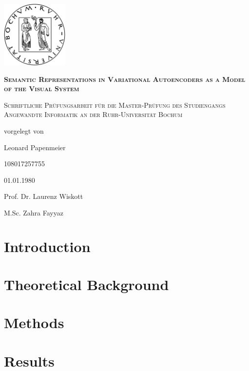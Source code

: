 \documentclass[11pt]{article}
\newcounter{savepage}
\begin{document}
    \begin{titlepage}
        \centering
        \includegraphics[width=0.25\textwidth]{rublogo.png}\par
        {\scshape\huge\bfseries Semantic Representations in Variational Autoencoders as a Model of the Visual System \par}
        {\scshape\large Schriftliche Prüfungsarbeit für die Master-Prüfung des Studiengangs Angewandte Informatik an der Ruhr-Universität Bochum\par}
        \vspace{1em}
        vorgelegt von\par
        \vspace{2em}
        Leonard Papenmeier\par 108017257755\par
        \vspace{2em}
        01.01.1980\par

        \vfill
        Prof. Dr. Laurenz Wiskott\par
        M.Sc. Zahra Fayyaz


    \end{titlepage}
    \tableofcontents
    \newpage


    \section{Introduction}\label{sec:introduction}


    \section{Theoretical Background}\label{sec:theoretical-background}
    


    \section{Methods}\label{sec:methods}
    


    \section{Results}\label{sec:results}
\end{document}
